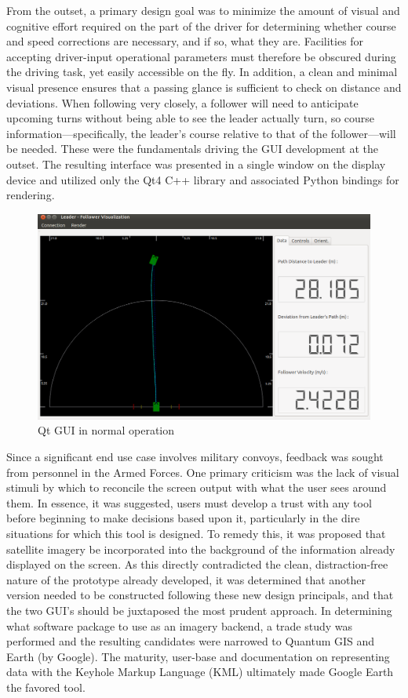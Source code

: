 \documentclass[twocolumn,10pt]{article}
\begin{document}
  From the outset, a primary design goal was to minimize the amount of visual and cognitive effort required on the part of the driver for determining whether course and speed corrections are necessary, and if so, what they are.  Facilities for accepting driver-input operational parameters must therefore be obscured during the driving task, yet easily accessible on the fly.  In addition, a clean and minimal visual presence ensures that a passing glance is sufficient to check on distance and deviations.  When following very closely, a follower will need to anticipate upcoming turns without being able to see the leader actually turn, so course information---specifically, the leader's course relative to that of the follower---will be needed.  These were the fundamentals driving the GUI development at the outset.  The resulting interface was presented in a single window on the display device and utilized only the Qt4 C++ library and associated Python bindings for rendering.

  \begin{figure}[ht] \centering
    \includegraphics[width=\columnwidth] {../graphics/final_design_data.png}
    \caption{Qt GUI in normal operation} \label{fig:qt_normal}
  \end{figure}

  Since a significant end use case involves military convoys, feedback was sought from personnel in the Armed Forces.  One primary criticism was the lack of visual stimuli by which to reconcile the screen output with what the user sees around them.  In essence, it was suggested, users must develop a trust with any tool before beginning to make decisions based upon it, particularly in the dire situations for which this tool is designed.  To remedy this, it was proposed that satellite imagery be incorporated into the background of the information already displayed on the screen.  As this directly contradicted the clean, distraction-free nature of the prototype already developed, it was determined that another version needed to be constructed following these new design principals, and that the two GUI's should be juxtaposed the most prudent approach. In determining what software package to use as an imagery backend, a trade study was performed and the resulting candidates were narrowed to Quantum GIS and Earth (by Google).  The maturity, user-base and documentation on representing data with the Keyhole Markup Language (KML) ultimately made Google Earth the favored tool.
\end{document}
